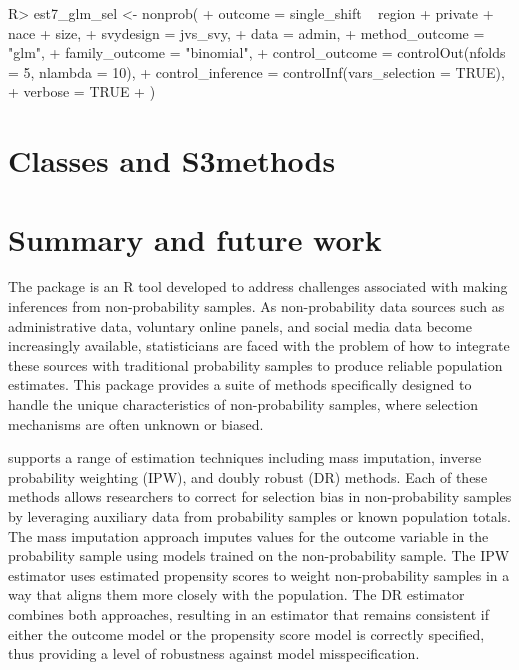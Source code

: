 \documentclass[
]{jss}
\begin{document}
\begin{CodeChunk}
\begin{CodeInput}
R> est7_glm_sel <- nonprob(
+   outcome = single_shift ~ region + private + nace + size,
+   svydesign = jvs_svy,
+   data = admin,
+   method_outcome = "glm",
+   family_outcome = "binomial",
+   control_outcome = controlOut(nfolds = 5, nlambda = 10),
+   control_inference = controlInf(vars_selection = TRUE),
+   verbose = TRUE
+ )
\end{CodeInput}
\end{CodeChunk}

\hypertarget{classes-and-s3methods}{%
\section{Classes and S3methods}\label{classes-and-s3methods}}

\hypertarget{summary-and-future-work}{%
\section{Summary and future work}\label{summary-and-future-work}}

The  package is an R tool developed to address
challenges associated with making inferences from non-probability
samples. As non-probability data sources such as administrative data,
voluntary online panels, and social media data become increasingly
available, statisticians are faced with the problem of how to integrate
these sources with traditional probability samples to produce reliable
population estimates. This package provides a suite of methods
specifically designed to handle the unique characteristics of
non-probability samples, where selection mechanisms are often unknown or
biased.

 supports a range of estimation techniques including
mass imputation, inverse probability weighting (IPW), and doubly robust
(DR) methods. Each of these methods allows researchers to correct for
selection bias in non-probability samples by leveraging auxiliary data
from probability samples or known population totals. The mass imputation
approach imputes values for the outcome variable in the probability
sample using models trained on the non-probability sample. The IPW
estimator uses estimated propensity scores to weight non-probability
samples in a way that aligns them more closely with the population. The
DR estimator combines both approaches, resulting in an estimator that
remains consistent if either the outcome model or the propensity score
model is correctly specified, thus providing a level of robustness
against model misspecification.
\end{document}
